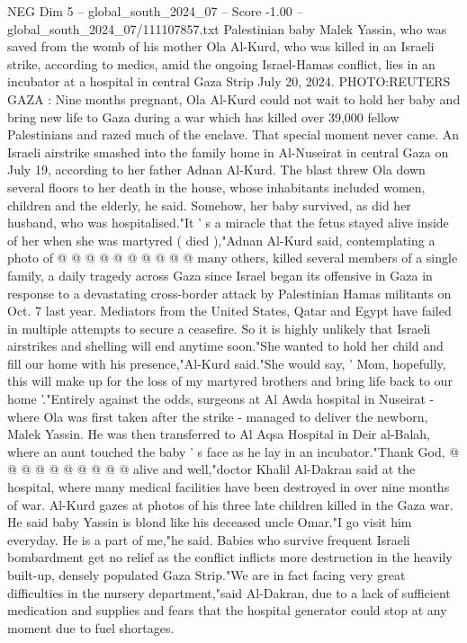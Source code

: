 \begin{textsample}{NEG Dim 5 – global\_south\_2024\_07 – Score -1.00 – global\_south\_2024\_07/111107857.txt}  \label{ex:f5_neg_294}
Palestinian baby Malek Yassin, who was saved from the womb of his mother Ola Al-Kurd, who was killed in an Israeli strike, according to medics, amid the ongoing Israel-Hamas conflict, lies in an incubator at a hospital in central Gaza Strip July 20, 2024.
PHOTO:REUTERS GAZA : Nine months pregnant, Ola Al-Kurd could not wait to hold her baby and bring new life to Gaza during a war which has killed over 39,000 fellow Palestinians and razed much of the enclave.
That special moment never came.
An Israeli airstrike smashed into the family home in Al-Nuseirat in central Gaza on July 19, according to her father Adnan Al-Kurd.
The blast threw Ola down several floors to her death in the house, whose inhabitants included women, children and the elderly, he said.
Somehow, her baby survived, as did her husband, who was hospitalised."It ' s a miracle that the fetus stayed alive inside of her when she was martyred ( died ),"Adnan Al-Kurd said, contemplating a photo of @ @ @ @ @ @ @ @ @ @ many others, killed several members of a single family, a daily tragedy across Gaza since Israel began its offensive in Gaza in response to a devastating cross-border attack by Palestinian Hamas militants on Oct. 7 last year.
Mediators from the United States, Qatar and Egypt have failed in multiple attempts to secure a ceasefire.
So it is highly unlikely that Israeli airstrikes and shelling will end anytime soon."She wanted to hold her child and fill our home with his presence,"Al-Kurd said."She would say, ' Mom, hopefully, this will make up for the loss of my martyred brothers and bring life back to our home '."Entirely against the odds, surgeons at Al Awda hospital in Nuseirat - where Ola was first taken after the strike - managed to deliver the newborn, Malek Yassin.
He was then transferred to Al Aqsa Hospital in Deir al-Balah, where an aunt touched the baby ' s face as he lay in an incubator."Thank God, @ @ @ @ @ @ @ @ @ @ alive and well,"doctor Khalil Al-Dakran said at the hospital, where many medical facilities have been destroyed in over nine months of war.
Al-Kurd gazes at photos of his three late children killed in the Gaza war.
He said baby Yassin is blond like his deceased uncle Omar."I go visit him everyday.
He is a part of me,"he said.
Babies who survive frequent Israeli bombardment get no relief as the conflict inflicts more destruction in the heavily built-up, densely populated Gaza Strip."We are in fact facing very great difficulties in the nursery department,"said Al-Dakran, due to a lack of sufficient medication and supplies and fears that the hospital generator could stop at any moment due to fuel shortages.

\end{textsample}

